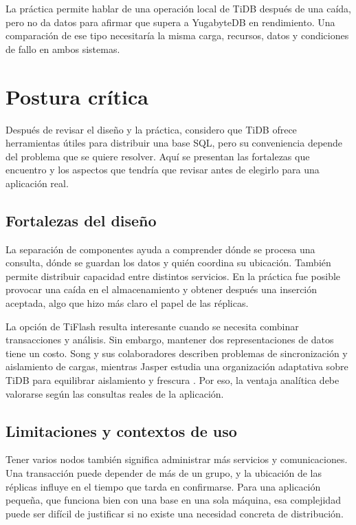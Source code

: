 \documentclass[11pt,a4paper]{article}
\begin{document}
La práctica permite hablar de una operación local de TiDB después de una caída, pero no da datos para afirmar que supera a YugabyteDB en rendimiento. Una comparación de ese tipo necesitaría la misma carga, recursos, datos y condiciones de fallo en ambos sistemas.

\section{Postura crítica}
Después de revisar el diseño y la práctica, considero que TiDB ofrece herramientas útiles para distribuir una base SQL, pero su conveniencia depende del problema que se quiere resolver. Aquí se presentan las fortalezas que encuentro y los aspectos que tendría que revisar antes de elegirlo para una aplicación real.

\subsection{Fortalezas del diseño}
La separación de componentes ayuda a comprender dónde se procesa una consulta, dónde se guardan los datos y quién coordina su ubicación. También permite distribuir capacidad entre distintos servicios. En la práctica fue posible provocar una caída en el almacenamiento y obtener después una inserción aceptada, algo que hizo más claro el papel de las réplicas.

La opción de TiFlash resulta interesante cuando se necesita combinar transacciones y análisis. Sin embargo, mantener dos representaciones de datos tiene un costo. Song y sus colaboradores describen problemas de sincronización y aislamiento de cargas, mientras Jasper estudia una organización adaptativa sobre TiDB para equilibrar aislamiento y frescura \cite{song2024survey,ding2026jasper}. Por eso, la ventaja analítica debe valorarse según las consultas reales de la aplicación.

\subsection{Limitaciones y contextos de uso}
Tener varios nodos también significa administrar más servicios y comunicaciones. Una transacción puede depender de más de un grupo, y la ubicación de las réplicas influye en el tiempo que tarda en confirmarse. Para una aplicación pequeña, que funciona bien con una base en una sola máquina, esa complejidad puede ser difícil de justificar si no existe una necesidad concreta de distribución.
\end{document}
